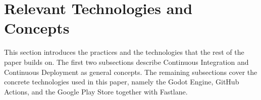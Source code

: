 \section{Relevant Technologies and Concepts}
This section introduces the practices and the technologies that the rest of the paper builds on. The first two subsections describe Continuous Integration and Continuous Deployment as general concepts. The remaining subsections cover the concrete technologies used in this paper, namely the Godot Engine, GitHub Actions, and the Google Play Store together with Fastlane.










